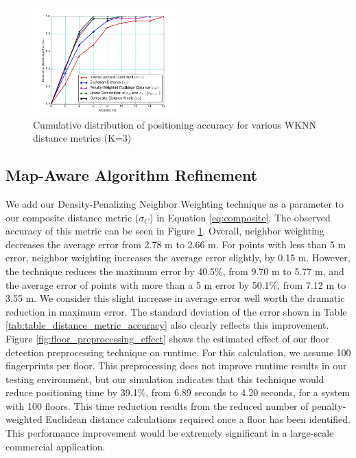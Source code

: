 \documentclass[conference]{IEEEtran}
\begin{document}
\begin{figure}[t!]
  \centering
    \includegraphics[width=0.5\textwidth]{distance_comparison.png}
    \caption{Cumulative distribution of positioning accuracy for various WKNN distance metrics (K=3)}
    \label{fig:cdf_positioning_accuracy}
\end{figure}


\subsection{Map-Aware Algorithm Refinement}

We add our Density-Penalizing Neighbor Weighting technique as a parameter to our composite distance metric ($\sigma_C$) in Equation \ref{eq:composite}. The observed accuracy of this metric can be seen in Figure \ref{fig:cdf_positioning_accuracy}. Overall, neighbor weighting decreases the average error from 2.78 m to 2.66 m. For points with less than 5 m error, neighbor weighting increases the average error slightly, by 0.15 m. However, the technique reduces the maximum error by 40.5\%, from 9.70 m to 5.77 m, and the average error of points with more than a 5 m error by 50.1\%, from 7.12 m to 3.55 m. We consider this slight increase in average error well worth the dramatic reduction in maximum error. The standard deviation of the error shown in Table \ref{tab:table_distance_metric_accuracy} also clearly reflects this improvement.\\	
\indent Figure \ref{fig:floor_preprocessing_effect} shows the estimated effect of our floor detection preprocessing technique on runtime. For this calculation, we assume 100 fingerprints per floor. This preprocessing does not improve runtime results in our testing environment, but our simulation indicates that this technique would reduce positioning time by 39.1\%, from 6.89 seconds to 4.20 seconds, for a system with 100 floors. This time reduction results from the reduced number of penalty-weighted Euclidean distance calculations required once a floor has been identified. This performance improvement would be extremely significant in a large-scale commercial application.
\end{document}
